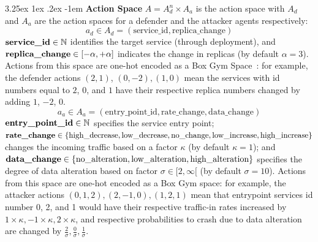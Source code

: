 \documentclass[conference]{IEEEtran}
\makeatletter
\renewcommand\paragraph{\@startsection{paragraph}{5}{\z@}%
  {3.25ex \@plus1ex \@minus.2ex}%
  {-1em}%
  {\normalfont\normalsize\bfseries}}
\makeatother
\begin{document}

\noindent \paragraph{\textbf{Action Space}} $A = A_d^n \times A_a$ is the action space with $A_d$ and $A_a$ are the action spaces for a defender and the attacker agents respectively:
$$
a_d \in A_d = (\text{service\_id}, \text{replica\_change})
$$
$\text{\textbf{service\_id}} \in \mathbb{N}$ identifies the target service (through deployment), and $\text{\textbf{replica\_change}} \in [-\alpha, +\alpha]$ indicates the change in replicas (by default $\alpha = 3$). Actions from this space are one-hot encoded as a Box Gym Space~\cite{openAIGymActionSpaces}: for example, the defender actions $(2,1)$, $(0,-2), (1,0)$ mean the services with id numbers equal to $2$, $0$, and $1$ have their respective replica numbers changed by adding $1$, $-2$, $0$.
%
$$
a_a \in A_a = (\text{entry\_point\_id}, \text{rate\_change}, \text{data\_change})
$$
$\text{\textbf{entry\_point\_id}} \in \mathbb{N}$ specifies the service entry point;
$\text{\textbf{rate\_change}} \in \{\text{high\_decrease}, \text{low\_decrease}, \text{no\_change}, \allowbreak \text{low\_increase}, \allowbreak \text{high\_increase}\}$ changes the incoming traffic based on a factor $\kappa$ (by default $\kappa = 1$); and $\text{\textbf{data\_change}} \in \{\text{no\_alteration}, \allowbreak \text{low\_alteration}, \allowbreak \text{high\_alteration}\}$ specifies the degree of data alteration based on factor $\sigma \in [2,\infty[$ (by default $\sigma = 10$). Actions from this space are one-hot encoded as a Box Gym space: for example, the attacker actions $(0,1,2), (2,-1,0), (1,2,1)$ mean that entrypoint services id number 0, 2, and 1 would have their respective traffic-in rates increased by $1 \times \kappa, -1 \times \kappa, 2 \times \kappa$, and respective probabilities to crash due to data alteration are changed by $\frac{2}{\sigma}, \frac{0}{\sigma}, \frac{1}{\sigma}$.

\
\end{document}
